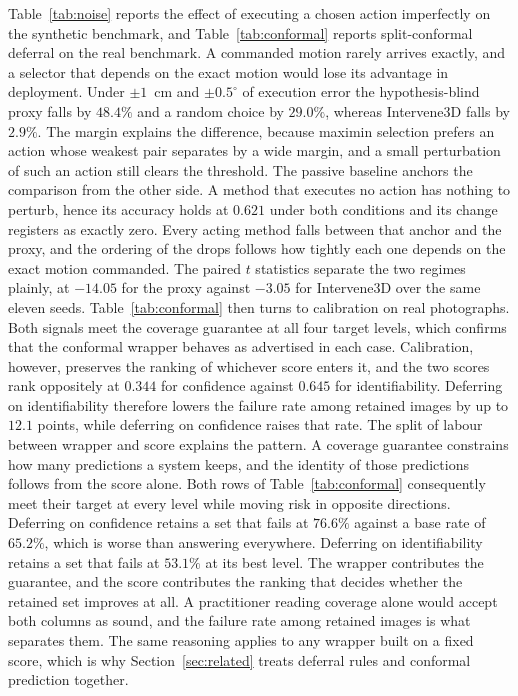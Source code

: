 \documentclass{article} %
\theoremstyle{defstyle}
\theoremstyle{plain}
\begin{document}
Table~\ref{tab:noise} reports the effect of executing a chosen action imperfectly on the
synthetic benchmark, and Table~\ref{tab:conformal} reports split-conformal deferral on the real
benchmark. A commanded motion rarely arrives exactly, and a selector that depends on the exact
motion would lose its advantage in deployment. Under $\pm 1$~cm and $\pm 0.5^{\circ}$ of
execution error the hypothesis-blind proxy falls by $48.4\%$ and a random choice by $29.0\%$,
whereas Intervene3D falls by $2.9\%$. The margin explains the difference, because maximin
selection prefers an action whose weakest pair separates by a wide margin, and a small
perturbation of such an action still clears the threshold. The passive baseline anchors the
comparison from the other side. A method that executes no action has nothing to perturb, hence
its accuracy holds at $0.621$ under both conditions and its change registers as exactly zero.
Every acting method falls between that anchor and the proxy, and the ordering of the drops
follows how tightly each one depends on the exact motion commanded. The paired $t$ statistics
separate the two regimes plainly, at $-14.05$ for the proxy against $-3.05$ for Intervene3D
over the same eleven seeds. Table~\ref{tab:conformal} then turns to calibration on real
photographs. Both signals meet the coverage guarantee at all four target levels, which confirms
that the conformal wrapper behaves as advertised in each case. Calibration, however, preserves
the ranking of whichever score enters it, and the two scores rank oppositely at $0.344$ for
confidence against $0.645$ for identifiability. Deferring on identifiability therefore lowers
the failure rate among retained images by up to $12.1$ points, while deferring on confidence
raises that rate. The split of labour between wrapper and score explains the pattern. A
coverage guarantee constrains how many predictions a system keeps, and the identity of those
predictions follows from the score alone. Both rows of Table~\ref{tab:conformal} consequently
meet their target at every level while moving risk in opposite directions. Deferring on
confidence retains a set that fails at $76.6\%$ against a base rate of $65.2\%$, which is worse
than answering everywhere. Deferring on identifiability retains a set that fails at $53.1\%$ at
its best level. The wrapper contributes the guarantee, and the score contributes the ranking
that decides whether the retained set improves at all. A practitioner reading coverage alone
would accept both columns as sound, and the failure rate among retained images is what
separates them. The same reasoning applies to any wrapper built on a fixed score, which is why
Section~\ref{sec:related} treats deferral rules and conformal prediction together.
\end{document}
